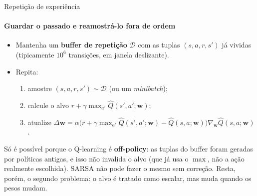 \documentclass[aspectratio=169, 11pt]{beamer}
\newcommand{\Qhat}{\widehat{Q}}
\newcommand{\wv}{\mathbf{w}}
\begin{document}
\begin{frame}{Repetição de experiência}
  \framesubtitle{Guardar o passado e reamostrá-lo fora de ordem}

  \begin{itemize}\setlength{\itemsep}{0.3ex}
    \item Mantenha um \textbf{buffer de repetição} $\mathcal{D}$ com as
      tuplas $(s,a,r,s')$ já vividas (tipicamente $10^6$ transições, em
      janela deslizante).
    \item Repita:
      \begin{enumerate}\setlength{\itemsep}{0.15ex}
        \item amostre $(s,a,r,s') \sim \mathcal{D}$ (ou um \emph{minibatch});
        \item calcule o alvo $r + \gamma \max_{a'} \Qhat(s',a';\wv)$;
        \item atualize
          $\Delta\wv = \alpha\bigl(r + \gamma\max_{a'}\Qhat(s',a';\wv) - \Qhat(s,a;\wv)\bigr)\nabla_{\wv}\Qhat(s,a;\wv)$.
      \end{enumerate}
  \end{itemize}

  \begin{ideiabox}
    Só é possível porque o Q-learning é \textbf{off-policy}: as tuplas do
    buffer foram geradas por políticas antigas, e isso não invalida o alvo
    (que já usa o $\max$, não a ação realmente escolhida). SARSA não pode
    fazer o mesmo sem correção. Resta, porém, o segundo problema: o alvo é
    tratado como escalar, mas muda quando os pesos mudam.
  \end{ideiabox}

\end{frame}
\end{document}
